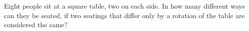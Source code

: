 Eight people sit at a square table, two on each side. In how many different ways can they be seated, if two seatings that differ only by a rotation of the table are considered the same?
